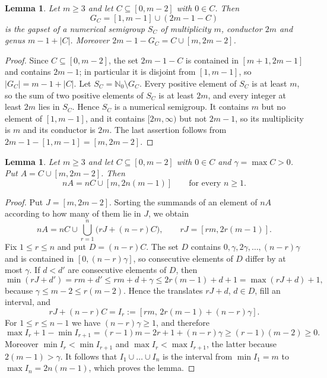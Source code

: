 \documentclass[11pt]{amsart}
\newtheorem{lemma}[theorem]{Lemma}
\theoremstyle{definition}
\theoremstyle{remark}
\numberwithin{equation}{section}
\newcommand{\NN}{\mathbb{N}_0}
\begin{document}
\begin{lemma}\label{lem:semigroup}
Let $m\ge 3$ and let $C\subseteq[0,m-2]$ with $0\in C$. Then
\[
G_C=[1,m-1]\cup(2m-1-C)
\]
is the gapset of a numerical semigroup $S_C$ of multiplicity $m$, conductor $2m$ and genus $m-1+|C|$. Moreover $2m-1-G_C=C\cup[m,2m-2]$.
\end{lemma}

\begin{proof}
Since $C\subseteq[0,m-2]$, the set $2m-1-C$ is contained in $[m+1,2m-1]$ and contains $2m-1$; in particular it is disjoint from $[1,m-1]$, so $|G_C|=m-1+|C|$. Let $S_C=\NN\setminus G_C$. Every positive element of $S_C$ is at least $m$, so the sum of two positive elements of $S_C$ is at least $2m$, and every integer at least $2m$ lies in $S_C$. Hence $S_C$ is a numerical semigroup. It contains $m$ but no element of $[1,m-1]$, and it contains $[2m,\infty)$ but not $2m-1$, so its multiplicity is $m$ and its conductor is $2m$. The last assertion follows from $2m-1-[1,m-1]=[m,2m-2]$.
\end{proof}

\begin{lemma}\label{lem:sumset}
Let $m\ge 3$ and let $C\subseteq[0,m-2]$ with $0\in C$ and $\gamma=\max C>0$. Put $A=C\cup[m,2m-2]$. Then
\[
nA=nC\cup[m,2n(m-1)]\qquad\text{for every } n\ge 1.
\]
\end{lemma}

\begin{proof}
Put $J=[m,2m-2]$. Sorting the summands of an element of $nA$ according to how many of them lie in $J$, we obtain
\[
nA=nC\cup\bigcup_{r=1}^{n}\bigl(rJ+(n-r)C\bigr),\qquad rJ=[rm,2r(m-1)].
\]
Fix $1\le r\le n$ and put $D=(n-r)C$. The set $D$ contains $0,\gamma,2\gamma,\dots,(n-r)\gamma$ and is contained in $[0,(n-r)\gamma]$, so consecutive elements of $D$ differ by at most $\gamma$. If $d<d'$ are consecutive elements of $D$, then
\[
\min(rJ+d')=rm+d'\le rm+d+\gamma\le 2r(m-1)+d+1=\max(rJ+d)+1,
\]
because $\gamma\le m-2\le r(m-2)$. Hence the translates $rJ+d$, $d\in D$, fill an interval, and
\[
rJ+(n-r)C=I_r:=[rm,\,2r(m-1)+(n-r)\gamma].
\]
For $1\le r\le n-1$ we have $(n-r)\gamma\ge 1$, and therefore
\[
\max I_r+1-\min I_{r+1}=(r-1)m-2r+1+(n-r)\gamma\ge(r-1)(m-2)\ge 0.
\]
Moreover $\min I_r<\min I_{r+1}$ and $\max I_r<\max I_{r+1}$, the latter because $2(m-1)>\gamma$. It follows that $I_1\cup\dots\cup I_n$ is the interval from $\min I_1=m$ to $\max I_n=2n(m-1)$, which proves the lemma.
\end{proof}
\end{document}
